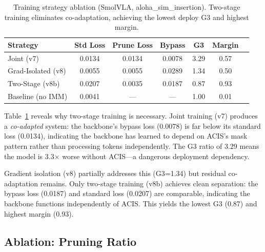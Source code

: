 \documentclass[conference]{corl_2026}
\begin{document}
\begin{table}[t]
\centering
\caption{Training strategy ablation (SmolVLA, aloha\_sim\_insertion). Two-stage training eliminates co-adaptation, achieving the lowest deploy G3 and highest margin.}
\label{tab:ablation_training}
\footnotesize
\begin{tabular}{@{}lcccccc@{}}
\toprule
Strategy & Std Loss & Prune Loss & Bypass & G3 & Margin \\
\midrule
Joint (v7) & 0.0134 & 0.0134 & 0.0078 & 3.29 & 0.57 \\
Grad-Isolated (v8) & 0.0055 & 0.0055 & 0.0289 & 1.34 & 0.50 \\
Two-Stage (v8b) & 0.0207 & 0.0035 & 0.0187 & 0.87 & 0.93 \\
Baseline (no IMM) & 0.0041 & --- & --- & 1.00 & 0.01 \\
\bottomrule
\end{tabular}
\end{table}

Table~\ref{tab:ablation_training} reveals why two-stage training is necessary. Joint training (v7) produces a \emph{co-adapted} system: the backbone's bypass loss (0.0078) is far below its standard loss (0.0134), indicating the backbone has learned to depend on ACIS's mask pattern rather than processing tokens independently. The G3 ratio of 3.29 means the model is 3.3$\times$ worse without ACIS---a dangerous deployment dependency.

Gradient isolation (v8) partially addresses this (G3=1.34) but residual co-adaptation remains. Only two-stage training (v8b) achieves clean separation: the bypass loss (0.0187) and standard loss (0.0207) are comparable, indicating the backbone functions independently of ACIS. This yields the lowest G3 (0.87) and highest margin (0.93).

\subsection{Ablation: Pruning Ratio}
\label{sec:ratio_sweep}
\end{document}
